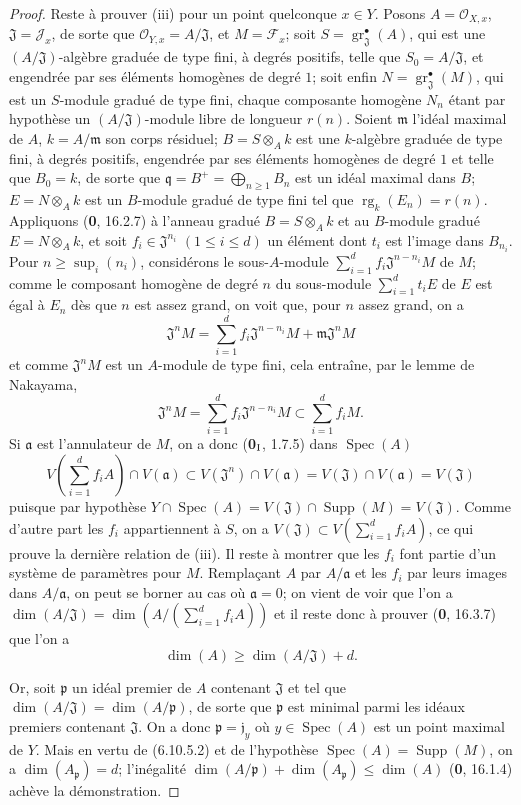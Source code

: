 \begin{proof}
Reste à prouver (iii) pour un point quelconque $x\in Y$. Posons
$A=\mathcal O_{X,x}$, $\mathfrak J=\mathcal J_x$, de sorte que
$\mathcal O_{Y,x}=A/\mathfrak J$, et $M=\mathcal F_x$; soit
$S=\operatorname{gr}_{\mathfrak J}^{\bullet}(A)$, qui est une
$(A/\mathfrak J)$-algèbre graduée de type fini, à degrés positifs, telle
que $S_0=A/\mathfrak J$, et engendrée par ses éléments homogènes de degré
$1$; soit enfin
$N=\operatorname{gr}_{\mathfrak J}^{\bullet}(M)$, qui est un $S$-module
gradué de type fini, chaque composante homogène $N_n$ étant par hypothèse
un $(A/\mathfrak J)$-module libre de longueur $r(n)$. Soient $\mathfrak m$
l'idéal maximal de $A$, $k=A/\mathfrak m$ son corps résiduel;
$B=S\otimes_A k$ est une $k$-algèbre graduée de type fini, à degrés
positifs, engendrée par ses éléments homogènes de degré $1$ et telle que
$B_0=k$, de sorte que $\mathfrak q=B^+=\bigoplus_{n\geq1}B_n$ est un idéal
maximal dans $B$; $E=N\otimes_A k$ est un $B$-module gradué de type fini
tel que $\operatorname{rg}_k(E_n)=r(n)$. Appliquons (\textbf{0}, 16.2.7) à l'anneau
gradué $B=S\otimes_A k$ et au $B$-module gradué $E=N\otimes_A k$, et soit
$f_i\in\mathfrak J^{n_i}$ $(1\leq i\leq d)$ un élément dont $t_i$ est
l'image dans $B_{n_i}$. Pour $n\geq\sup_i(n_i)$, considérons le sous-$A$-module
$\sum_{i=1}^{d}f_i\mathfrak J^{n-n_i}M$ de $M$; comme le composant homogène
de degré $n$ du sous-module $\sum_{i=1}^{d}t_iE$ de $E$ est égal à
$E_n$ dès que $n$ est assez grand, on voit que, pour $n$ assez grand, on a
\[
\mathfrak J^nM=\sum_{i=1}^{d}f_i\mathfrak J^{n-n_i}M+
\mathfrak m\mathfrak J^nM
\]
et comme $\mathfrak J^nM$ est un $A$-module de type fini, cela entraîne,
par le lemme de Nakayama,
\[
\mathfrak J^nM=\sum_{i=1}^{d}f_i\mathfrak J^{n-n_i}M
\subset\sum_{i=1}^{d}f_iM.
\]
Si $\mathfrak a$ est l'annulateur de $M$, on a donc (\textbf{0}$_{\rm I}$, 1.7.5)
dans $\operatorname{Spec}(A)$
\[
V\left(\sum_{i=1}^{d}f_iA\right)\cap V(\mathfrak a)
\subset V(\mathfrak J^n)\cap V(\mathfrak a)
=V(\mathfrak J)\cap V(\mathfrak a)=V(\mathfrak J)
\]
puisque par hypothèse
$Y\cap\operatorname{Spec}(A)=V(\mathfrak J)\cap\operatorname{Supp}(M)
=V(\mathfrak J)$. Comme d'autre part les $f_i$ appartiennent à
$S$, on a
$V(\mathfrak J)\subset V(\sum_{i=1}^{d}f_iA)$, ce qui prouve la dernière
relation de (iii). Il reste à montrer que les $f_i$ font partie d'un système
de paramètres pour $M$. Remplaçant $A$ par $A/\mathfrak a$ et les $f_i$ par
leurs images dans $A/\mathfrak a$, on peut se borner au cas où
$\mathfrak a=0$; on vient de voir que l'on a
$\dim(A/\mathfrak J)=\dim(A/(\sum_{i=1}^{d}f_iA))$
et il reste donc à prouver (\textbf{0}, 16.3.7) que l'on a
\[
\dim(A)\geq\dim(A/\mathfrak J)+d.
\]

Or, soit $\mathfrak p$ un idéal premier de $A$ contenant $\mathfrak J$ et
tel que $\dim(A/\mathfrak J)=\dim(A/\mathfrak p)$, de sorte que
$\mathfrak p$ est minimal parmi les idéaux premiers contenant
$\mathfrak J$. On a donc $\mathfrak p=\mathfrak j_y$ où
$y\in\operatorname{Spec}(A)$ est un point maximal de $Y$. Mais en vertu de
(6.10.5.2) et de l'hypothèse
$\operatorname{Spec}(A)=\operatorname{Supp}(M)$, on a
$\dim(A_{\mathfrak p})=d$; l'inégalité
$\dim(A/\mathfrak p)+\dim(A_{\mathfrak p})\leq\dim(A)$ (\textbf{0}, 16.1.4)
achève la démonstration.
\end{proof}

